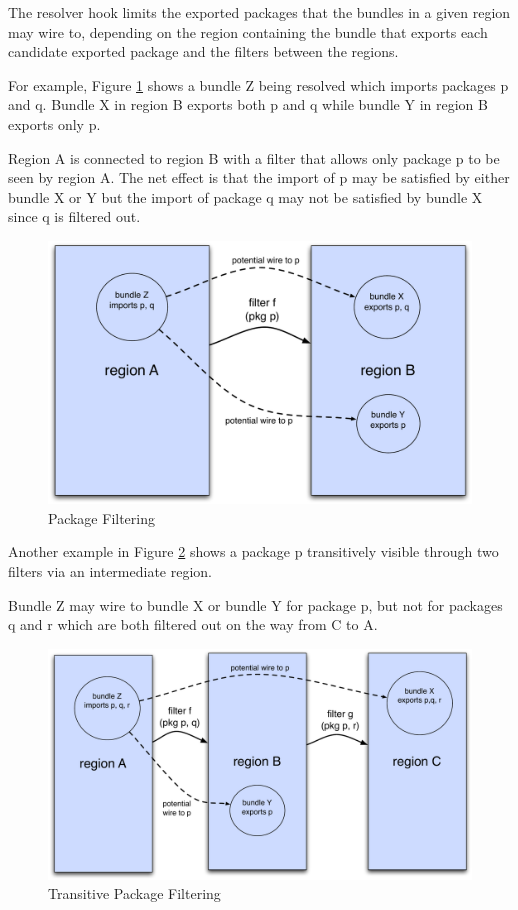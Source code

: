 \documentclass[a4paper,9pt]{article}
\begin{document}
The resolver hook limits the exported packages that the bundles in a given region may wire to, depending on
the region containing the bundle that exports each candidate exported package and the filters between the
regions.

For example, Figure \ref{fig:pfilt} shows a bundle Z being resolved which imports packages p and q. Bundle X
in region B exports both p and q while bundle Y in region B exports only p.

Region A is connected to region B with a filter that allows only package p to be seen by region A.
The net effect is that the import of p may be satisfied by either bundle X or Y but the import of package q may not
be satisfied by bundle X since q is filtered out.
\begin{figure}[h!]
\begin{center}
\includegraphics*[scale=0.4]{package-filtering.pdf}
\caption{Package Filtering}
\end{center}
\label{fig:pfilt}
\end{figure}

Another example in Figure \ref{fig:tpfilt} shows a package p transitively visible through two filters via an
intermediate region.

Bundle Z may wire to bundle X or bundle Y for package p, but not for packages q and r which are both
filtered out on the way from C to A.
\begin{figure}[h!]
\begin{center}
\includegraphics*[scale=0.4]{transitive-package-filtering.pdf}
\caption{Transitive Package Filtering}
\end{center}
\label{fig:tpfilt}
\end{figure}
\end{document}
